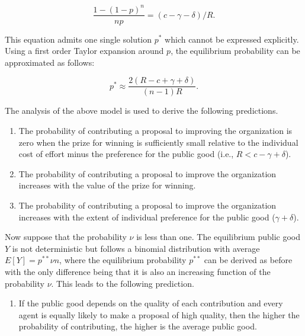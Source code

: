 \documentclass[11pt, titlepage]{article}
\providecommand{\tightlist}{%
  \setlength{\itemsep}{0pt}\setlength{\parskip}{0pt}}
\begin{document}
\begin{equation} \label{eq: mixed-strategy}
  \frac{1- (1-p)^{n}}{n p} = (c- \gamma - \delta) / R.
\end{equation}

This equation admits one single solution \(p^*\) which cannot be
expressed explicitly. Using a first order Taylor expansion around \(p\),
the equilibrium probability can be approximated as follows:

\begin{equation} \label{eq: probability}
  p^*  \approx \frac{2 (R- c+\gamma +\delta )}{(n-1) R}. 
\end{equation}

The analysis of the above model is used to derive the following
predictions.

\begin{enumerate}
\def\labelenumi{\arabic{enumi})}
\item
  The probability of contributing a proposal to improving the
  organization is zero when the prize for winning is sufficiently small
  relative to the individual cost of effort minus the preference for the
  public good (i.e., \(R< c-\gamma +\delta\)).
\item
  The probability of contributing a proposal to improve the organization
  increases with the value of the prize for winning.
\item
  The probability of contributing a proposal to improve the organization
  increases with the extent of individual preference for the public good
  (\(\gamma+\delta\)).
\end{enumerate}

Now suppose that the probability \(\nu\) is less than one. The
equilibrium public good \(Y\) is not deterministic but follows a
binomial distribution with average \(E[Y] = p^{**}\nu n\), where the
equilibrium probability \(p^{**}\) can be derived as before with the
only difference being that it is also an increasing function of the
probability \(\nu\). This leads to the following prediction.

\begin{enumerate}
\def\labelenumi{\arabic{enumi})}
\setcounter{enumi}{3}
\tightlist
\item
  If the public good depends on the quality of each contribution and
  every agent is equally likely to make a proposal of high quality, then
  the higher the probability of contributing, the higher is the average
  public good.
\end{enumerate}
\end{document}
